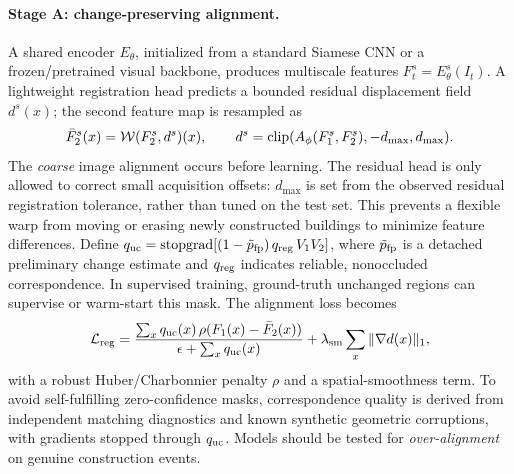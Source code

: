 \documentclass[11pt,a4paper]{article}
\begin{document}
\paragraph{Stage A: change-preserving alignment.} A shared encoder $E_{\theta}$, initialized from a standard Siamese CNN or a frozen/pretrained visual backbone, produces multiscale features $F_t^s=E_{\theta}^s(I_t)$. A lightweight registration head predicts a bounded residual displacement field $d^s(x)$; the second feature map is resampled as
\begin{equation}
 \bar F_2^s(x)={\cal W}(F_2^s,d^s)(x),\qquad
 d^s=\operatorname{clip}(A_{\phi}(F_1^s,F_2^s),-d_{\max},d_{\max}).
 \label{eq:align}
\end{equation}
The \emph{coarse} image alignment occurs before learning. The residual head is only allowed to correct small acquisition offsets: $d_{\max}$ is set from the observed residual registration tolerance, rather than tuned on the test set. This prevents a flexible warp from moving or erasing newly constructed buildings to minimize feature differences. Define $q_{\rm uc}=\operatorname{stopgrad}[(1-\tilde p_{\rm fp})\,q_{\rm reg}\,V_1V_2]$, where $\tilde p_{\rm fp}$ is a detached preliminary change estimate and $q_{\rm reg}$ indicates reliable, nonoccluded correspondence. In supervised training, ground-truth unchanged regions can supervise or warm-start this mask. The alignment loss becomes
\begin{equation}
 {\cal L}_{\rm reg}=\frac{\sum_x q_{\rm uc}(x)\,\rho(F_1(x)-\bar F_2(x))}{\epsilon+\sum_x q_{\rm uc}(x)}
 +\lambda_{\rm sm}\sum_x\|\nabla d(x)\|_1,
 \label{eq:regloss}
\end{equation}
with a robust Huber/Charbonnier penalty $\rho$ and a spatial-smoothness term. To avoid self-fulfilling zero-confidence masks, correspondence quality is derived from independent matching diagnostics and known synthetic geometric corruptions, with gradients stopped through $q_{\rm uc}$. Models should be tested for \emph{over-alignment} on genuine construction events.
\end{document}

